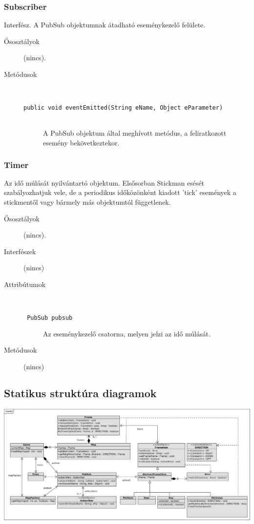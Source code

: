 		\subsubsection{Subscriber} Interfész.
				 A PubSub objektumnak átadható eseménykezelő felülete. 			\begin{description}


				\item[Ősosztályok] (nincs).
				\item[Metódusok]$\ $
					\begin{description}
						\item[\texttt{public void eventEmitted(String eName, Object eParameter)}] \hfill \\ A PubSub objektum által meghívott metódus,  a feliratkozott esemény bekövetkeztekor. 
					\end{description}
			\end{description}

		\subsubsection{Timer}
				 Az idő múlását nyilvántartó objektum.   Elsősorban Stickman esését szabályozhatjuk vele, de a  periodikus időközönként kiadott 'tick' események  a stickmentől vagy bármely más objektumtól függetlenek.  			\begin{description}


				\item[Ősosztályok] (nincs).
				\item[Interfészek] (nincs)
				\item[Attribútumok]$\ $
					\begin{description}
						\item[\texttt{ PubSub pubsub}] Az eseménykezelő csatorna,  melyen jelzi az idő múlását. 
					\end{description}
				\item[Metódusok] (nincs)
			\end{description}


	\subsection{Statikus struktúra diagramok}

		\begin{center}
			\includegraphics[scale=0.7, angle=-90]{resources/model.png}
		\end{center}
			
